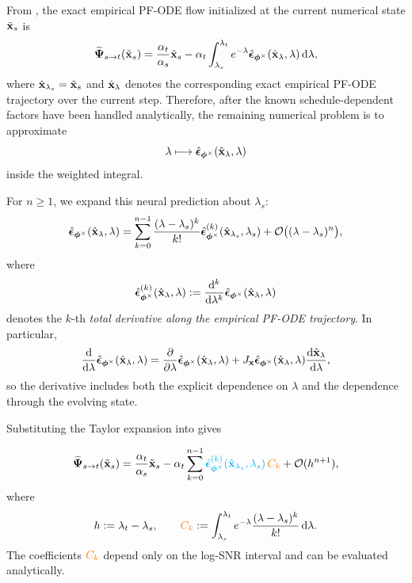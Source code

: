 From , the exact empirical PF-ODE flow initialized
at the current numerical state $\tilde{{\mathbf{x}}}_s$ is
\begin{equation}
\label{eqn:analytic_solution_each_step}
\widetilde{{\bm{\Psi}}}_{s\to t}(\tilde{{\mathbf{x}}}_s)
=
\frac{\alpha_t}{\alpha_s}\tilde{{\mathbf{x}}}_s
-
\alpha_t
\int_{\lambda_s}^{\lambda_t}
e^{-\lambda}
\hat{\bm{\epsilon}}_{\bm{\phi}^\times}
(\hat{{\mathbf{x}}}_\lambda,\lambda)
\mathop{}\!\mathrm{d}\lambda,
\end{equation}
where
$\hat{{\mathbf{x}}}_{\lambda_s}=\tilde{{\mathbf{x}}}_s$ and
$\hat{{\mathbf{x}}}_\lambda$ denotes the corresponding exact empirical PF-ODE
trajectory over the current step. Therefore, after the known
schedule-dependent factors have been handled analytically, the remaining
numerical problem is to approximate
\[
\lambda
\longmapsto
\hat{\bm{\epsilon}}_{\bm{\phi}^\times}
(\hat{{\mathbf{x}}}_\lambda,\lambda)
\]
inside the weighted integral.

For $n\geq1$, we expand this neural prediction about $\lambda_s$:
\begin{equation*}
\hat{\bm{\epsilon}}_{\bm{\phi}^\times}
(\hat{{\mathbf{x}}}_\lambda,\lambda)
=
\sum_{k=0}^{n-1}
\frac{(\lambda-\lambda_s)^k}{k!}
\hat{\bm{\epsilon}}_{\bm{\phi}^\times}^{(k)}
(\hat{{\mathbf{x}}}_{\lambda_s},\lambda_s)
+
\mathcal O\bigl((\lambda-\lambda_s)^n\bigr),
\end{equation*}
where
\[
\hat{\bm{\epsilon}}_{\bm{\phi}^\times}^{(k)}
(\hat{{\mathbf{x}}}_\lambda,\lambda)
:=
\frac{\mathop{}\!\mathrm{d}^k}{\mathop{}\!\mathrm{d}\lambda^k}
\hat{\bm{\epsilon}}_{\bm{\phi}^\times}
(\hat{{\mathbf{x}}}_\lambda,\lambda)
\]
denotes the $k$-th \emph{total derivative along the empirical PF-ODE
trajectory}. In particular,
\[
\frac{\mathop{}\!\mathrm{d}}{\mathop{}\!\mathrm{d}\lambda}
\hat{\bm{\epsilon}}_{\bm{\phi}^\times}
(\hat{{\mathbf{x}}}_\lambda,\lambda)
=
\frac{\partial}{\partial\lambda}
\hat{\bm{\epsilon}}_{\bm{\phi}^\times}
(\hat{{\mathbf{x}}}_\lambda,\lambda)
+
J_{{\mathbf{x}}}
\hat{\bm{\epsilon}}_{\bm{\phi}^\times}
(\hat{{\mathbf{x}}}_\lambda,\lambda)
\frac{\mathop{}\!\mathrm{d}\hat{{\mathbf{x}}}_\lambda}{\mathop{}\!\mathrm{d}\lambda},
\]
so the derivative includes both the explicit dependence on $\lambda$ and the
dependence through the evolving state.

Substituting the Taylor expansion into
 gives
\begin{mdframed}
\begin{equation}
\label{eq:k-th-expansion}
\widetilde{{\bm{\Psi}}}_{s\to t}(\tilde{{\mathbf{x}}}_s)
=
\frac{\alpha_t}{\alpha_s}\tilde{{\mathbf{x}}}_s
-
\alpha_t
\sum_{k=0}^{n-1}
{\color{cyan}
\hat{\bm{\epsilon}}_{\bm{\phi}^\times}^{(k)}
(\hat{{\mathbf{x}}}_{\lambda_s},\lambda_s)}
\,{\color{orange}C_k}
+
\mathcal O(h^{n+1}),
\end{equation}
where
\[
h:=\lambda_t-\lambda_s,
\qquad
{\color{orange}C_k}
:=
\int_{\lambda_s}^{\lambda_t}
e^{-\lambda}
\frac{(\lambda-\lambda_s)^k}{k!}
\mathop{}\!\mathrm{d}\lambda.
\]
The coefficients ${\color{orange}C_k}$ depend only on the log-SNR interval
and can be evaluated analytically.
\end{mdframed}

